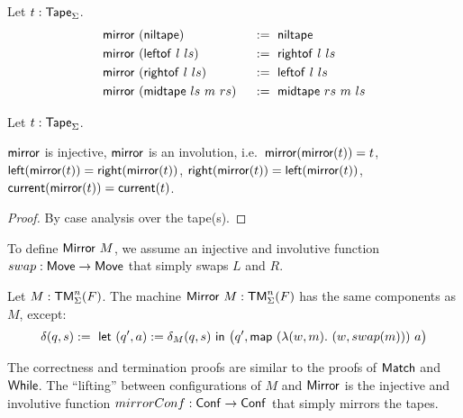 %
\begin{definition}
  \label{def:mirror_tape}
  Let $t : \mathsf{Tape}_\Sigma$.
  \begin{alignat*}{2}
    & \mathsf{mirror}~(\mathsf{niltape})         &&~:=~ \mathsf{niltape} \\
    & \mathsf{mirror}~(\mathsf{leftof}~l~ls)     &&~:=~ \mathsf{rightof}~l~ls \\
    & \mathsf{mirror}~(\mathsf{rightof}~l~ls)    &&~:=~ \mathsf{leftof}~l~ls \\
    & \mathsf{mirror}~(\mathsf{midtape}~ls~m~rs) &&~:=~ \mathsf{midtape}~rs~m~ls
  \end{alignat*}
\end{definition}
\begin{lemma}
  \label{lem:mirror}
  Let $t:\mathsf{Tape}_\Sigma$.
  \begin{enumerate}
   \label{lem:mirror_tape_injective}
    $\mathsf{mirror}$ is injective,
   \label{lem:mirror_tape_involution}
    $\mathsf{mirror}$ is an involution, i.e.\ $\mathsf{mirror}(\mathsf{mirror}(t))=t$,
   \label{lem:mirror_left}
    $\mathsf{left}(\mathsf{mirror}(t)) = \mathsf{right}(\mathsf{mirror}(t))$,
   \label{lem:mirror_right}
    $\mathsf{right}(\mathsf{mirror}(t)) = \mathsf{left}(\mathsf{mirror}(t))$,
   \label{lem:mirror_current}
    $\mathsf{current}(\mathsf{mirror}(t)) = \mathsf{current}(t)$.
  \end{enumerate}
\end{lemma}
\begin{proof}
  By case analysis over the tape(s).
\end{proof}


To define $\MS{Mirror}~M$, we assume an injective and involutive function $swap:\mathsf{Move} \rightarrow \mathsf{Move}$ that simply swaps $L$ and $R$.
%
\begin{definition}[$\MS{Mirror}~M$][Mirror]
  \label{def:Mirror}
  Let $M:\mathsf{TM}_\Sigma^n(F)$.  The machine $\mathsf{Mirror}~M : \mathsf{TM}_\Sigma^n(F)$ has the same components as $M$, except:
  \[
    \delta(q, s) :=~
    \mathsf{let}~(q', a) := \delta_M(q,s)~\mathsf{in}~\bigl(q', \mathsf{map}~(\lambda(w, m).~(w, swap(m)))~a \bigr)
  \]
\end{definition}

The correctness and termination proofs are similar to the proofs of $\mathsf{Match}$ and $\mathsf{While}$.  The ``lifting'' between configurations of $M$ and
$\mathsf{Mirror}$ is the injective and involutive function $mirrorConf : \mathsf{Conf} \rightarrow \mathsf{Conf}$ that simply mirrors the tapes.

